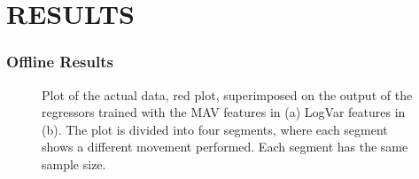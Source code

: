 \section*{RESULTS}%

\subsubsection*{Offline Results}


\begin{figure}[H]
	\centering
	\caption{Plot of the actual data, red plot, superimposed on the output of the regressors trained with the MAV features in (a) LogVar features in (b). The plot is divided into four segments, where each segment shows a different movement performed. Each segment has the same sample size.}
	\label{fig:SuperPositionTraining}
\end{figure}

